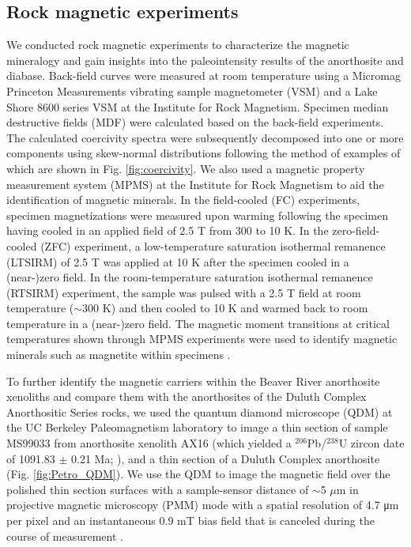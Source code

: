 \documentclass[9pt,twocolumn,twoside,lineno]{pnas-new}
\begin{document}
{\subsection*{Rock magnetic experiments}

We conducted rock magnetic experiments to characterize the magnetic mineralogy and gain insights into the paleointensity results of the anorthosite and diabase. Back-field curves were measured at room temperature using a Micromag Princeton Measurements vibrating sample magnetometer (VSM) and a Lake Shore 8600 series VSM at the Institute for Rock Magnetism. Specimen median destructive fields (MDF) were calculated based on the back-field experiments. The calculated coercivity spectra were subsequently decomposed into one or more components using skew-normal distributions following the method of  \citealp{Maxbauer2016a} examples of which are shown in Fig. \ref{fig:coercivity}. We also used a magnetic property measurement system (MPMS) at the Institute for Rock Magnetism to aid the identification of magnetic minerals. In the field-cooled (FC) experiments, specimen magnetizations were measured upon warming following the specimen having cooled in an applied field of 2.5 T from 300 to 10 K. In the zero-field-cooled (ZFC) experiment, a low-temperature saturation isothermal remanence (LTSIRM) of 2.5 T was applied at 10 K after the specimen cooled in a (near-)zero field. In the room-temperature saturation isothermal remanence (RTSIRM) experiment, the sample was pulsed with a 2.5 T field at room temperature ($\sim$300 K) and then cooled to 10 K and warmed back to room temperature in a (near-)zero field. The magnetic moment transitions at critical temperatures shown through MPMS experiments were used to identify magnetic minerals such as magnetite within specimens \cite{Feinberg2015a}. 

To further identify the magnetic carriers within the Beaver River anorthosite xenoliths and compare them with the anorthosites of the Duluth Complex Anorthositic Series rocks, we used the quantum diamond microscope (QDM) at the UC Berkeley Paleomagnetism laboratory to image a thin section of sample MS99033 from anorthosite xenolith AX16 (which yielded a $^{206}$Pb/$^{238}$U zircon date of 1091.83 $\pm$ 0.21 Ma;  \citealp{Zhang2021b}), and a thin section of a Duluth Complex anorthosite (Fig. \ref{fig:Petro_QDM}). We use the QDM to image the magnetic field over the polished thin section surfaces with a sample-sensor distance of $\sim$5 $\mu$m in projective magnetic microscopy (PMM) mode with a spatial resolution of 4.7 μm per pixel and an instantaneous 0.9 mT bias field that is canceled during the course of measurement \cite{Glenn2017a}.
}
\end{document}
